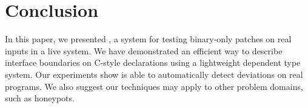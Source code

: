 \section{Conclusion}
\label{tach:sec:conclusion}
In this paper, we presented \tachyon, a system for testing binary-only
patches on real inputs in a live system. We have demonstrated an
efficient way to describe interface boundaries on C-style declarations
using a lightweight dependent type system.  Our experiments show
\tachyon is able to automatically detect deviations on real
programs. We also suggest our techniques may apply to other problem
domains, such as honeypots.


